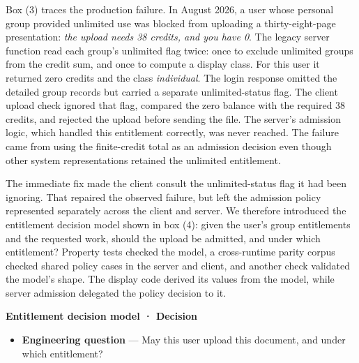 Box (3) traces the production failure. In August 2026, a user whose personal group provided unlimited use was blocked from uploading a thirty-eight-page presentation: \emph{the upload needs 38 credits, and you have 0}. The legacy server function read each group's unlimited flag twice: once to exclude unlimited groups from the credit sum, and once to compute a display class. For this user it returned zero credits and the class \emph{individual}. The login response omitted the detailed group records but carried a separate unlimited-status flag. The client upload check ignored that flag, compared the zero balance with the required 38 credits, and rejected the upload before sending the file. The server's admission logic, which handled this entitlement correctly, was never reached. The failure came from using the finite-credit total as an admission decision even though other system representations retained the unlimited entitlement.


The immediate fix made the client consult the unlimited-status flag it had been ignoring. That repaired the observed failure, but left the admission policy represented separately across the client and server. We therefore introduced the entitlement decision model shown in box (4): given the user's group entitlements and the requested work, should the upload be admitted, and under which entitlement? Property tests checked the model, a cross-runtime parity corpus checked shared policy cases in the server and client, and another check validated the model's shape. The display code derived its values from the model, while server admission delegated the policy decision to it.

\textbf{Entitlement decision model · Decision}

\begin{itemize}
\tightlist
\item
  \textbf{Engineering question} --- May this user upload this document, and under which entitlement?
\end{itemize}

